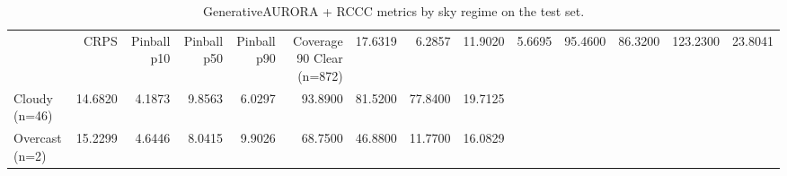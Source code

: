 \begin{table}[ht]
\centering
\caption{GenerativeAURORA + RCCC metrics by sky regime on the test set.}
\label{tab:regime}
\begin{tabular}{lrrrrrrrr}
\toprule
 & CRPS & Pinball p10 & Pinball p50 & Pinball p90 & Coverage 90%
\midrule
Clear (n=872) & 17.6319 & 6.2857 & 11.9020 & 5.6695 & 95.4600 & 86.3200 & 123.2300 & 23.8041 \\
Cloudy (n=46) & 14.6820 & 4.1873 & 9.8563 & 6.0297 & 93.8900 & 81.5200 & 77.8400 & 19.7125 \\
Overcast (n=2) & 15.2299 & 4.6446 & 8.0415 & 9.9026 & 68.7500 & 46.8800 & 11.7700 & 16.0829 \\
\bottomrule
\end{tabular}
\end{table}